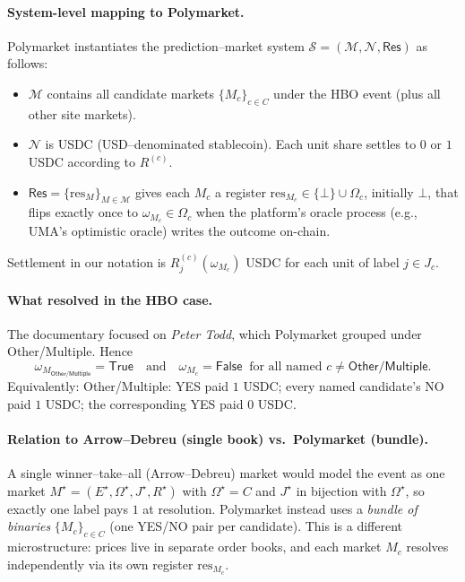 \paragraph{System-level mapping to Polymarket.}
Polymarket instantiates the prediction–market system $\mathcal{S}=(\mathcal{M},\mathcal{N},\mathsf{Res})$ as follows:
\begin{itemize}
  \item $\mathcal{M}$ contains all candidate markets $\{M_c\}_{c\in C}$ under the HBO event (plus all other site markets).
  \item $\mathcal{N}$ is USDC (USD–denominated stablecoin). Each unit share settles to $0$ or $1$ USDC according to $R^{(c)}$.
  \item $\mathsf{Res}=\{\mathrm{res}_{M}\}_{M\in\mathcal{M}}$ gives each $M_c$ a register $\mathrm{res}_{M_c}\in\{\bot\}\cup\Omega_c$,
        initially $\bot$, that flips exactly once to $\omega_{M_c}\in\Omega_c$ when the platform’s oracle process (e.g., UMA’s optimistic oracle) writes the outcome on-chain.
\end{itemize}
Settlement in our notation is $R^{(c)}_j(\omega_{M_c})$ USDC for each unit of label $j\in J_c$.

\paragraph{What resolved in the HBO case.}
The documentary focused on \emph{Peter Todd}, which Polymarket grouped under \textsf{Other/Multiple}. Hence
\[
  \omega_{M_{\textsf{Other/Multiple}}}=\mathsf{True}
  \quad\text{and}\quad
  \omega_{M_c}=\mathsf{False}\ \text{ for all named }c\neq\textsf{Other/Multiple}.
\]
Equivalently: \textsf{Other/Multiple: YES} paid $1$ USDC; every named candidate’s \textsf{NO} paid $1$ USDC; the corresponding \textsf{YES} paid $0$ USDC.

\paragraph{Relation to Arrow--Debreu (single book) vs.\ Polymarket (bundle).}
A single winner–take–all (Arrow--Debreu) market would model the event as one market $M^\star=(E^\star,\Omega^\star,J^\star,R^\star)$ with
$\Omega^\star=C$ and $J^\star$ in bijection with $\Omega^\star$, so exactly one label pays $1$ at resolution.
Polymarket instead uses a \emph{bundle of binaries} $\{M_c\}_{c\in C}$ (one YES/NO pair per candidate). This is a different microstructure:
prices live in separate order books, and each market $M_c$ resolves independently via its own register $\mathrm{res}_{M_c}$.

